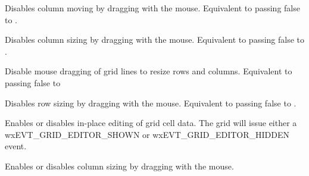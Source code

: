 
Disables column moving by dragging with the mouse. Equivalent to passing false to
.



\label{wxgriddisabledragcolsize}


Disables column sizing by dragging with the mouse. Equivalent to passing false to
.



\label{wxgriddisabledraggridsize}


Disable mouse dragging of grid lines to resize rows and columns. Equivalent to passing
false to 



\label{wxgriddisabledragrowsize}


Disables row sizing by dragging with the mouse. Equivalent to passing false to
.



\label{wxgridenablecelleditcontrol}


Enables or disables in-place editing of grid cell data. The grid will issue either a
wxEVT\_GRID\_EDITOR\_SHOWN or wxEVT\_GRID\_EDITOR\_HIDDEN event.



\label{wxgridenabledragcolsize}


Enables or disables column sizing by dragging with the mouse.



\label{wxgridenabledragcolmove}


